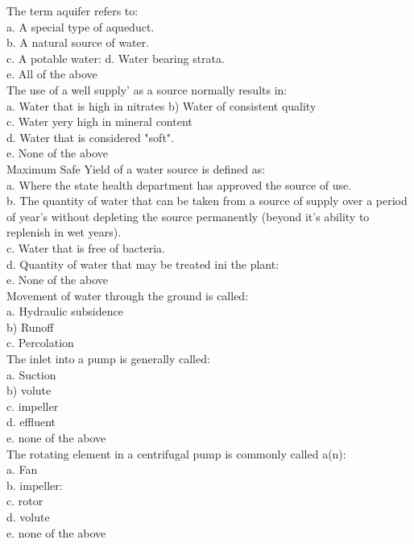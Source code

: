 The term aquifer refers to:\\
a. A special type of aqueduct.\\
b. A natural source of water.\\
c. A potable water: 
d. Water bearing strata.\\
e. All of the above\\

The use of a well supply' as a source normally results in:\\
a. Water that is high in nitrates b) Water of consistent quality\\
c. Water yery high in mineral content\\
d. Water that is considered "soft".\\
e. None of the above\\

Maximum Safe Yield of a water source is defined as:\\
a. Where the state health department has approved the source of use.\\
b. The quantity of water that can be taken from a source of supply over a period of year's without depleting the source permanently (beyond it's ability to replenish in wet years).\\
c. Water that is free of bacteria.\\
d. Quantity of water that may be treated ini the plant:\\
e. None of the above\\

Movement of water through the ground is called:\\
a. Hydraulic subsidence\\
b) Runoff\\
c. Percolation\\

The inlet into a pump is generally called:\\
a. Suction\\
b) volute\\
c. impeller\\
d. effluent\\
e. none of the above\\

The rotating element in a centrifugal pump is commonly called a(n):\\
a. Fan\\
b. impeller:\\
c. rotor\\
d. volute\\
e. none of the above\\

